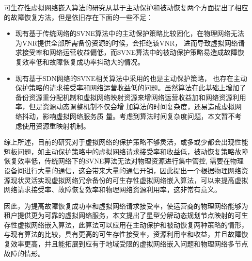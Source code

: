 可生存性虚拟网络嵌入算法的研究从基于主动保护和被动恢复两个方面提出了相应的故障恢复方法，但是依旧存在下面的一些不足：
\begin{itemize}
  \item 现有基于传统网络的SVNE算法中的主动保护策略比较固化，在物理网络无法为VNR提供全部所需备份资源的时候，会拒绝该VNR， 进而导致虚拟网络请求接受率和网络运营收益偏低，而SVNE算法中的被动保护策略易造成故障恢复效率低和故障恢复成功率抖动大的情况。
  \item 现有基于SDN网络的SVNE相关算法中采用的也是主动保护策略， 也存在主动保护策略的请求接受率和网络运营收益低的问题。虽然算法在此基础上增加了备份资源重分配机制\cite{yu2008rethinking}和虚拟网络映射资源来增网络运营收益加和网络资源利用率，但是资源动态调整机制不仅会增 加算法的时间复杂度，还易造成虚拟网络抖动，影响虚拟网络服务质 量。考虑到算法时间复杂度问题，本文暂不考虑使用资源重映射机制。
\end{itemize}

综上所述，目前的研究对于虚拟网络的保护策略不够灵活，或多或少都会出现性能短板问题，如主动保护策略中的虚拟网络请求接受率和收益低，被动恢复策略故障恢复效率低，传统网络下的SVNE算法无法对物理资源进行集中管控, 需要在物理设备间进行大量的通信，这会带来大量的通信开销，因此提出一个根据物理网络资源现状灵活实现虚拟网络冗佘备份的可生存性虚拟网络嵌入算法，可以来提高虚拟网络请求接受率、故障恢复效率和物理网络资源利用率，这非常有意义。

因此，为提高故障恢复成功率和虚拟网络请求接受率，使运营商的物理网络能够为租户提供更为可靠的虚拟网络服务，本文提出了星型分解动态规划节点映射的可生存性虚拟网络嵌入算法，此算法可以应用在主动保护和被动恢复两种策略的情形，与现有算法的比较，具有更高的可生存性接受率，资源利用率和收益，并且故障恢复效率更高，并且能拓展到应有于地域受限的虚拟网络嵌入问题和物理网络多节点故障的情形。




